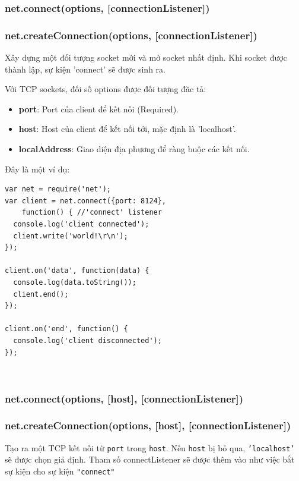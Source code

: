       \subsubsection{net.connect(options, [connectionListener])}
      \subsubsection{net.createConnection(options, [connectionListener])} 
      Xây dựng một đối tượng socket mới và mở socket nhất định. Khi socket được thành lập, sự kiện 'connect' sẽ được sinh ra.
      
      Với TCP sockets, đối số options được đối tượng đăc tả:
        \begin{itemize}
            \item \textbf{port}: Port của client để kết nối (Required).
            \item \textbf{host}: Host của client để kết nối tới, mặc định là 'localhost'.
            \item \textbf{localAddress}: Giao diện địa phương để ràng buộc các kết nối.
        \end{itemize}

Đây là một ví dụ:
    \begin{verbatim}
var net = require('net');
var client = net.connect({port: 8124},
    function() { //'connect' listener
  console.log('client connected');
  client.write('world!\r\n');
});

client.on('data', function(data) {
  console.log(data.toString());
  client.end();
});

client.on('end', function() {
  console.log('client disconnected');
});   
    \end{verbatim}
    
    \\
    \subsubsection{net.connect(options, [host], [connectionListener])}
    \subsubsection{net.createConnection(options, [host], [connectionListener])}
        Tạo ra một TCP kết nối từ \texttt{port} trong \texttt{host}. Nếu \texttt{host} bị bỏ qua, \texttt{'localhost'} sẽ được chọn giả định. Tham số connectListener sẽ được thêm vào như việc bắt sự kiện cho sự kiện \texttt{"connect"}
     
